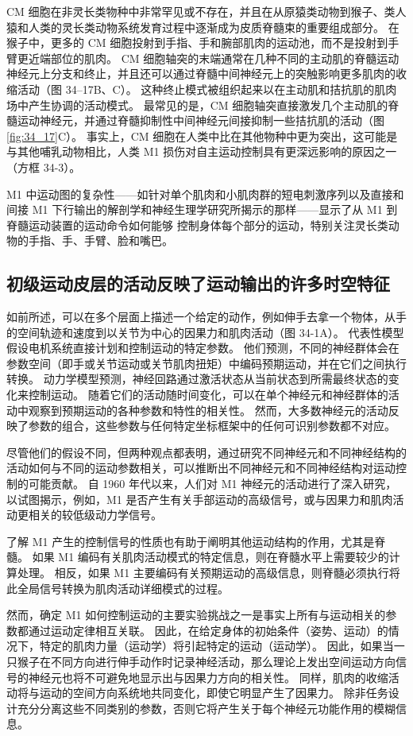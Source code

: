 CM 细胞在非灵长类物种中非常罕见或不存在，并且在从原猿类动物到猴子、类人猿和人类的灵长类动物系统发育过程中逐渐成为皮质脊髓束的重要组成部分。 在猴子中，更多的 CM 细胞投射到手指、手和腕部肌肉的运动池，而不是投射到手臂更近端部位的肌肉。 CM 细胞轴突的末端通常在几种不同的主动肌的脊髓运动神经元上分支和终止，并且还可以通过脊髓中间神经元上的突触影响更多肌肉的收缩活动（图 34–17B、C）。 这种终止模式被组织起来以在主动肌和拮抗肌的肌肉场中产生协调的活动模式。 最常见的是，CM 细胞轴突直接激发几个主动肌的脊髓运动神经元，并通过脊髓抑制性中间神经元间接抑制一些拮抗肌的活动（图 \ref{fig:34_17}C）。 事实上，CM 细胞在人类中比在其他物种中更为突出，这可能是与其他哺乳动物相比，人类 M1 损伤对自主运动控制具有更深远影响的原因之一（方框 34-3）。

M1 中运动图的复杂性——如针对单个肌肉和小肌肉群的短电刺激序列以及直接和间接 M1 下行输出的解剖学和神经生理学研究所揭示的那样——显示了从 M1 到脊髓运动装置的运动命令如何能够 控制身体每个部分的运动，特别关注灵长类动物的手指、手、手臂、脸和嘴巴。

\subsection{初级运动皮层的活动反映了运动输出的许多时空特征}
如前所述，可以在多个层面上描述一个给定的动作，例如伸手去拿一个物体，从手的空间轨迹和速度到以关节为中心的因果力和肌肉活动（图 34-1A）。 代表性模型假设电机系统直接计划和控制运动的特定参数。 他们预测，不同的神经群体会在参数空间（即手或关节运动或关节肌肉扭矩）中编码预期运动，并在它们之间执行转换。 动力学模型预测，神经回路通过激活状态从当前状态到所需最终状态的变化来控制运动。 随着它们的活动随时间变化，可以在单个神经元和神经群体的活动中观察到预期运动的各种参数和特性的相关性。 然而，大多数神经元的活动反映了参数的组合，这些参数与任何特定坐标框架中的任何可识别参数都不对应。

尽管他们的假设不同，但两种观点都表明，通过研究不同神经元和不同神经结构的活动如何与不同的运动参数相关，可以推断出不同神经元和不同神经结构对运动控制的可能贡献。 自 1960 年代以来，人们对 M1 神经元的活动进行了深入研究，以试图揭示，例如，M1 是否产生有关手部运动的高级信号，或与因果力和肌肉活动更相关的较低级动力学信号。

了解 M1 产生的控制信号的性质也有助于阐明其他运动结构的作用，尤其是脊髓。 如果 M1 编码有关肌肉活动模式的特定信息，则在脊髓水平上需要较少的计算处理。 相反，如果 M1 主要编码有关预期运动的高级信息，则脊髓必须执行将此全局信号转换为肌肉活动详细模式的过程。

然而，确定 M1 如何控制运动的主要实验挑战之一是事实上所有与运动相关的参数都通过运动定律相互关联。 因此，在给定身体的初始条件（姿势、运动）的情况下，特定的肌肉力量（运动学）将引起特定的运动（运动学）。 因此，如果当一只猴子在不同方向进行伸手动作时记录神经活动，那么理论上发出空间运动方向信号的神经元也将不可避免地显示出与因果力方向的相关性。 同样，肌肉的收缩活动将与运动的空间方向系统地共同变化，即使它明显产生了因果力。 除非任务设计充分分离这些不同类别的参数，否则它将产生关于每个神经元功能作用的模糊信息。


